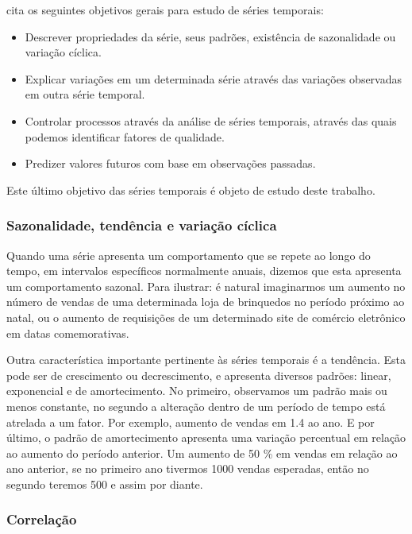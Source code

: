 \documentclass[twoside,english,brazilian]{UNISINOSmonografia}
\begin{document}
\cite{Ehlers2009} cita os seguintes objetivos gerais para estudo de séries temporais:

\begin{itemize}
	\item Descrever propriedades da série, seus padrões, existência de sazonalidade ou variação cíclica.
	\item Explicar variações em um determinada série através das variações observadas em outra série temporal.
	\item Controlar processos através da análise de séries temporais, através das quais podemos identificar fatores de qualidade.
	\item Predizer valores futuros com base em observações passadas. 
\end{itemize}

Este último objetivo das séries temporais é objeto de estudo deste trabalho.

\subsubsection{Sazonalidade, tendência e variação cíclica}

Quando uma série apresenta um comportamento que se repete ao longo do tempo, em intervalos específicos normalmente anuais, dizemos que esta apresenta um comportamento sazonal. Para ilustrar: é natural imaginarmos um aumento no número de vendas de uma determinada loja de brinquedos no período próximo ao natal, ou o aumento de requisições de um determinado site de comércio eletrônico em datas comemorativas. 

Outra característica importante pertinente às séries temporais é a tendência. Esta pode ser de crescimento ou decrescimento, e apresenta diversos padrões: linear, exponencial e de amortecimento. No primeiro, observamos um padrão mais ou menos constante, no segundo a alteração dentro de um período de tempo está atrelada a um fator. Por exemplo, aumento de vendas em 1.4 ao ano. E por último, o padrão de amortecimento apresenta uma variação percentual em relação ao aumento do período anterior. Um aumento de 50 \% em vendas em relação ao ano anterior, se no primeiro ano tivermos 1000 vendas esperadas, então no segundo teremos 500 e assim por diante.


\subsubsection{Correlação}
\end{document}
